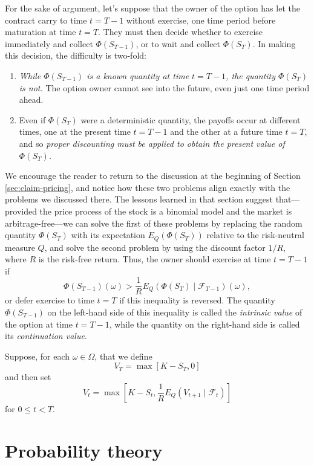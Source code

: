 \documentclass[reqno]{amsart}
\theoremstyle{definition}
\numberwithin{equation}{section}
\begin{document}
For the sake of argument, let's suppose that the owner of the option has let the contract carry to time $t=T-1$ without exercise, one time period before maturation at time $t=T$. They must then decide whether to exercise immediately and collect $\Phi(S_{T-1})$, or to wait and collect $\Phi(S_T)$. In making this decision, the difficulty is two-fold:
\begin{enumerate}
\item \textit{While $\Phi(S_{T-1})$ is a known quantity at time $t=T-1$, the quantity $\Phi(S_T)$ is not.} The option owner cannot see into the future, even just one time period ahead.
\item Even if $\Phi(S_T)$ were a deterministic quantity, the payoffs occur at different times, one at the present time $t=T-1$ and the other at a future time $t=T$, and so \textit{proper discounting must be applied to obtain the present value of $\Phi(S_T)$.}
\end{enumerate}
We encourage the reader to return to the discussion at the beginning of Section \ref{sec:claim-pricing}, and notice how these two problems align exactly with the problems we discussed there. The lessons learned in that section suggest that---provided the price process of the stock is a binomial model and the market is arbitrage-free---we can solve the first of these problems by replacing the random quantity $\Phi(S_T)$ with its expectation $E_Q(\Phi(S_T))$ relative to the risk-neutral measure $Q$, and solve the second problem by using the discount factor $1/R$, where $R$ is the risk-free return. Thus, the owner should exercise at time $t=T-1$ if
	\begin{equation}\label{eq:american-intrinsic-continuation}
	\Phi(S_{T-1})(\omega) > \frac{1}{R} E_Q\left(\Phi(S_T)\mid \mathcal{F}_{T-1}\right)(\omega),
	\end{equation}
or defer exercise to time $t=T$ if this inequality is reversed. The quantity $\Phi(S_{T-1})$ on the left-hand side of this inequality is called the \textit{intrinsic value} of the option at time $t=T-1$, while the quantity on the right-hand side is called its \textit{continuation value}.

Suppose, for each $\omega\in \Omega$, that we define
	\[
	V_T = \max{ \left[ K-S_T, 0 \right]}
	\]
and then set
	\[
	V_t = \max{ \left[ K-S_t, \frac{1}{R} E_Q\left( V_{t+1} \mid \mathcal{F}_t \right)\right]}
	\]
for $0 \leq t < T$.

\appendix
\section{Probability theory}
\end{document}
